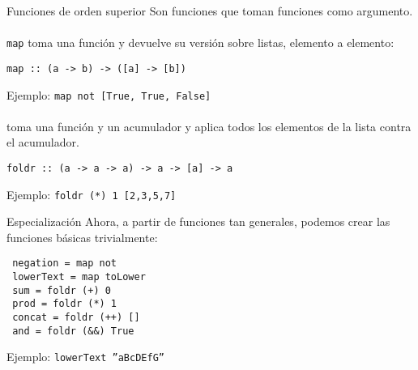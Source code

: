 \begin{frame}[fragile]{Funciones de orden superior}
  Son funciones que toman funciones como argumento.
  \\~\\
  \texttt{map} toma una función y devuelve su versión sobre listas,
  elemento a elemento:
  \begin{lstlisting}
map :: (a -> b) -> ([a] -> [b])
  \end{lstlisting}
  Ejemplo: \texttt{map not [True, True, False]}
  \\~\\
   toma una función y un acumulador y aplica todos los elementos
  de la lista contra el acumulador.
  \begin{lstlisting}
foldr :: (a -> a -> a) -> a -> [a] -> a
  \end{lstlisting}
  Ejemplo: \texttt{foldr (*) 1 [2,3,5,7]}
\end{frame}

\begin{frame}[fragile]{Especialización}
  Ahora, a partir de funciones tan generales, podemos crear las funciones básicas
  trivialmente:
  \begin{lstlisting}
 negation = map not
 lowerText = map toLower
 sum = foldr (+) 0
 prod = foldr (*) 1
 concat = foldr (++) []
 and = foldr (&&) True
  \end{lstlisting}
  Ejemplo: \texttt{lowerText ''aBcDEfG''}
  
\end{frame}
